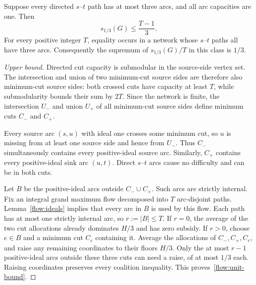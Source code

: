 \begin{theorem}\label{flow:unit}
Suppose every directed $s$--$t$ path has at most three arcs, and all arc
capacities are one. Then
\begin{equation}\label{flow:unit-bound}
                     s_{1/3}(G)\le\frac{T-1}{3}.
\end{equation}
For every positive integer $T$, equality occurs in a network whose
$s$--$t$ paths all have three arcs. Consequently the supremum of
$s_{1/3}(G)/T$ in this class is $1/3$.
\end{theorem}
\begin{proof}[Upper bound]
Directed cut capacity is submodular in the source-side vertex set.
The intersection and union of two minimum-cut source sides are therefore
also minimum-cut source sides: both crossed cuts have capacity at least
$T$, while submodularity bounds their sum by $2T$. Since the network is
finite, the intersection $U_-$ and union $U_+$ of all minimum-cut source
sides define minimum cuts $C_-$ and $C_+$.

Every source arc $(s,u)$ with ideal one crosses some minimum cut, so $u$
is missing from at least one source side and hence from $U_-$. Thus
$C_-$ simultaneously contains every positive-ideal source arc. Similarly,
$C_+$ contains every positive-ideal sink arc $(u,t)$. Direct $s$--$t$
arcs cause no difficulty and can be in both cuts.

Let $B$ be the positive-ideal arcs outside $C_-\cup C_+$. Such arcs are
strictly internal. Fix an integral grand maximum flow decomposed into
$T$ arc-disjoint paths. Lemma~\ref{flow:ideals} implies that every arc
in $B$ is used by this flow. Each path has at most one strictly internal
arc, so $r:=|B|\le T$. If $r=0$, the average of the two cut allocations
already dominates $H/3$ and has zero subsidy. If $r>0$, choose $e\in B$
and a minimum cut $C_e$ containing it. Average the allocations of
$C_-,C_+,C_e$, and raise any remaining coordinates to their floors $H/3$.
Only the at most $r-1$ positive-ideal arcs outside these three cuts can
need a raise, of at most $1/3$ each. Raising coordinates preserves every
coalition inequality. This proves~\eqref{flow:unit-bound}.
\end{proof}

